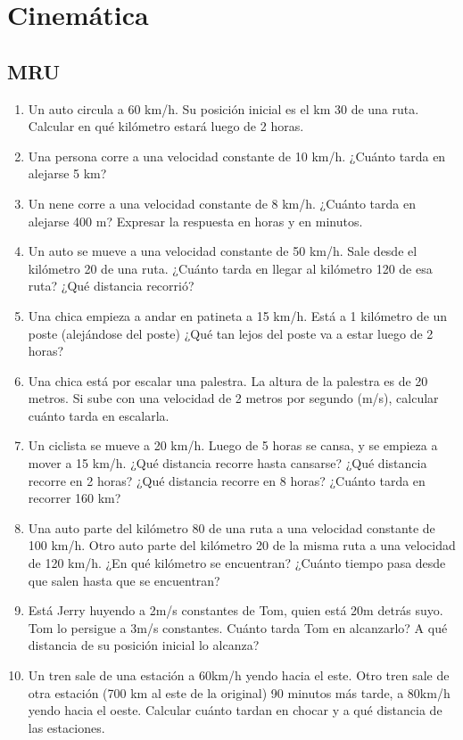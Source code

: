 \section{Cinemática}

\subsection{MRU}

\begin{enumerate}
\item Un auto circula a 60 km/h. Su posición inicial es el km 30 de una ruta. Calcular en qué kilómetro estará luego de 2 horas.

\item Una persona corre a una velocidad constante de 10 km/h. ¿Cuánto tarda en alejarse 5 km? %

\item Un nene corre a una velocidad constante de 8 km/h. ¿Cuánto tarda en alejarse 400 m? Expresar la respuesta en horas y en minutos. %

\item Un auto se mueve a una velocidad constante de 50 km/h. Sale desde el kilómetro 20 de una ruta. ¿Cuánto tarda en llegar al kilómetro 120 de esa ruta? ¿Qué distancia recorrió? %

\item Una chica empieza a andar en patineta a 15 km/h. Está a 1 kilómetro de un poste (alejándose del poste) ¿Qué tan lejos del poste va a estar luego de 2 horas?

\item Una chica está por escalar una palestra. La altura de la palestra es de 20 metros. Si sube con una velocidad de 2 metros por segundo (m/s), calcular cuánto tarda en escalarla.

\item Un ciclista se mueve a 20 km/h. Luego de 5 horas se cansa, y se empieza a mover a 15 km/h. ¿Qué distancia recorre hasta cansarse? ¿Qué distancia recorre en 2 horas? ¿Qué distancia recorre en 8 horas? ¿Cuánto tarda en recorrer 160 km? %

\item Una auto parte del kilómetro 80 de una ruta a una velocidad constante de 100 km/h. Otro auto parte del kilómetro 20 de la misma ruta a una velocidad de 120 km/h. ¿En qué kilómetro se encuentran? ¿Cuánto tiempo pasa desde que salen hasta que se encuentran? %

\item Está Jerry huyendo a 2m/s constantes de Tom, quien está 20m detrás suyo. Tom lo persigue a 3m/s constantes. Cuánto tarda Tom en alcanzarlo? A qué distancia de su posición inicial lo alcanza?

\item Un tren sale de una estación a 60km/h yendo hacia el este. Otro tren sale de otra estación (700 km al este de la original) 90 minutos más tarde, a 80km/h yendo hacia el oeste. Calcular cuánto tardan en chocar y a qué distancia de las estaciones.

\end{enumerate}


